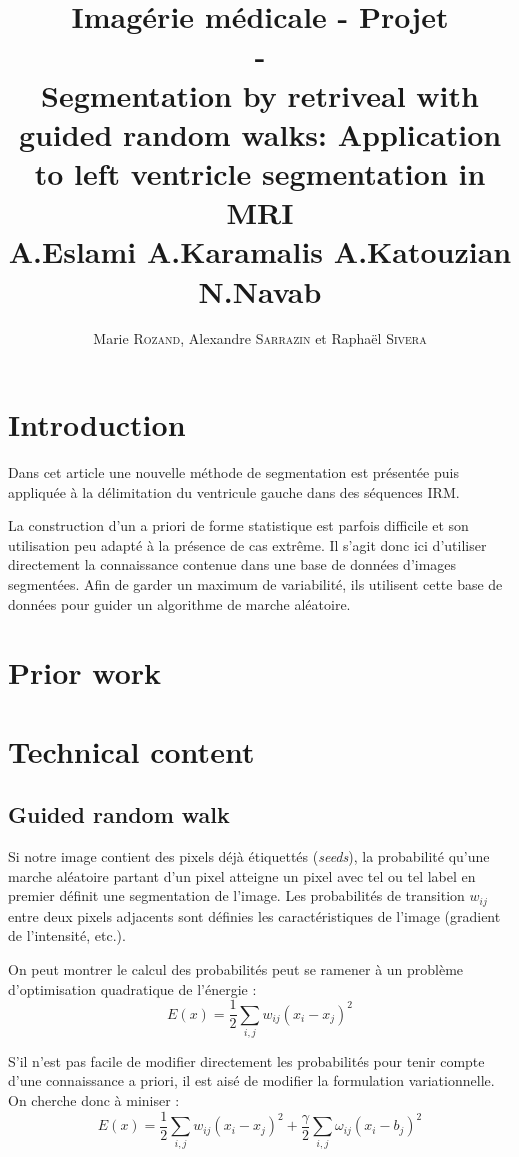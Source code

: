 \documentclass{article}
\title{Imagérie médicale - Projet \\ - \\ \small{Segmentation by retriveal with guided random walks: Application to left ventricle segmentation in MRI \\ A.Eslami A.Karamalis A.Katouzian N.Navab}}
\author{Marie \textsc{Rozand}, Alexandre \textsc{Sarrazin} et Raphaël \textsc{Sivera}}
\begin{document}
\maketitle

\section{Introduction}

Dans cet article une nouvelle méthode de segmentation est présentée puis appliquée à la délimitation du ventricule gauche dans des séquences IRM.

La construction d'un a priori de forme statistique est parfois difficile et son utilisation peu adapté à la présence de cas extrême. Il s'agit donc ici d'utiliser directement la connaissance contenue dans une base de données d'images segmentées. Afin de garder un maximum de variabilité, ils utilisent cette base de données pour guider un algorithme de marche aléatoire.


\section{Prior work}

\section{Technical content}

\subsection{Guided random walk}

Si notre image contient des pixels déjà étiquettés (\textit{seeds}), la probabilité qu'une marche aléatoire partant d'un pixel atteigne un pixel avec tel ou tel label en premier définit une segmentation de l'image. Les probabilités de transition $w_{ij}$ entre deux pixels adjacents sont définies les caractéristiques de l'image (gradient de l'intensité, etc.).

On peut montrer le calcul des probabilités peut se ramener à un problème d'optimisation quadratique de l'énergie : 
$$ E(x)= \frac{1}{2} \sum_{i,j}{w_{ij} (x_i -x_j)^2} $$

S'il n'est pas facile de modifier directement les probabilités pour tenir compte d'une connaissance a priori, il est aisé de modifier la formulation variationnelle. On cherche donc à miniser :
$$ E(x)= \frac{1}{2} \sum_{i,j}{w_{ij} (x_i -x_j)^2} + \frac{\gamma}{2} \sum_{i,j}{\omega_{ij} (x_i -b_j)^2}$$
\end{document}
